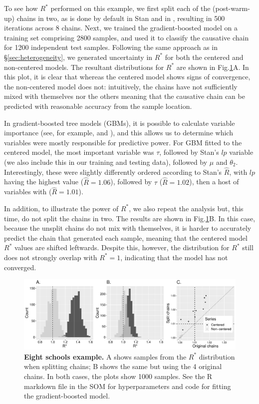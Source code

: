 \documentclass{article}
\begin{document}
To see how $R^*$ performed on this example, we first split each of the (post-warm-up) chains in two, as is done by default in Stan \cite{carpenter2017stan} and in \cite{vehtari2019rank}, resulting in 500 iterations across 8 chains. Next, we trained the gradient-boosted model on a training set comprising 2800 samples, and used it to classify the causative chain for 1200 independent test samples. Following the same approach as in \S\ref{sec:heterogeneity}, we generated uncertainty in $R^*$ for both the centered and non-centered models. The resultant distributions for $R^*$ are shown in Fig.\ref{fig:eight_schools}A. In this plot, it is clear that whereas the centered model shows signs of convergence, the non-centered model does not: intuitively, the chains have not sufficiently mixed with themselves nor the others meaning that the causative chain can be predicted with reasonable accuracy from the sample location.

In gradient-boosted tree models (GBMs), it is possible to calculate variable importance (see, for example, \cite{friedman2001greedy} and \cite{greenwell2019package}), and this allows us to determine which variables were mostly responsible for predictive power. For GBM fitted to the centered model, the most important variable was $\tau$, followed by Stan's $lp$ variable (we also include this in our training and testing data), followed by $\mu$ and $\theta_2$. Interestingly, these were slightly differently ordered according to Stan's $\hat{R}$, with $lp$ having the highest value ($\hat R = 1.06$), followed by $\tau$ ($\hat R = 1.02$), then a host of variables with ($\hat R = 1.01$).

In addition, to illustrate the power of $R^*$, we also repeat the analysis but, this time, do not split the chains in two. The results are shown in Fig.\ref{fig:eight_schools}B. In this case, because the unsplit chains do not mix with themselves, it is harder to accurately predict the chain that generated each sample, meaning that the centered model $R^*$ values are shifted leftwards. Despite this, however, the distribution for $R^*$ still does not strongly overlap with $R^*=1$, indicating that the model has not converged.

\begin{figure}[h]
	\centerline{\includegraphics[width=1.0\textwidth]{../output/eight_schools.pdf}}
	\caption{\textbf{Eight schools example.} A shows samples from the $R^*$ distribution when splitting chains; B shows the same but using the 4 original chains. In both cases, the plots show 1000 samples. See the R markdown file in the SOM for hyperparameters and code for fitting the gradient-boosted model.}
	\label{fig:eight_schools}
\end{figure}
\end{document}
